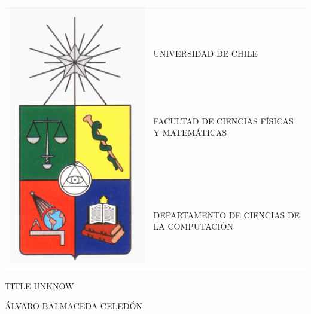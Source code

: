 \documentclass[11pt,oneside,letterpaper,leqno]{report}
\newcommand{\memtitle}{TITLE UNKNOW}
\newcommand{\autor}{Álvaro Balmaceda Celedón}
\newcommand{\dpto}{DEPARTAMENTO DE CIENCIAS DE LA COMPUTACIÓN}
\newcommand{\Memtitle}{\MakeUppercase{\memtitle}}
\newcommand{\Author}{\MakeUppercase{\autor}}
\newcommand{\Dpto}{\MakeUppercase{\dpto}}
\begin{document}
\begin{center}
\begin{tabular}{rl}
\multirow{5}{*}{\includegraphics[scale=0.1]{Figuras/escudoU.png}} &\\
& \\
& UNIVERSIDAD DE CHILE\\
& FACULTAD DE CIENCIAS FÍSICAS Y MATEMÁTICAS\\
& \Dpto\\
& \\
\end{tabular}

\vspace{1cm}

\Memtitle

\vspace{0.5cm}
\Author
\vspace{0.5cm}
\end{center}
\end{document}
